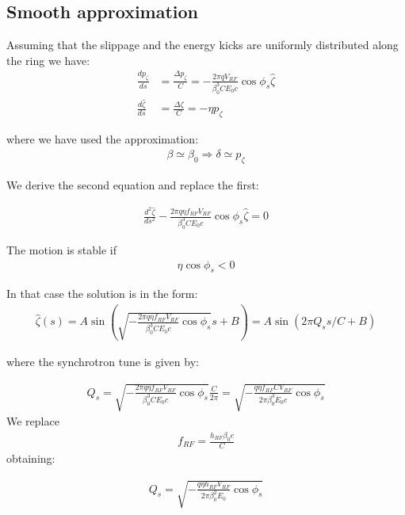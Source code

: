 \subsection{Smooth approximation}

Assuming that the slippage and the energy kicks are uniformly distributed along the ring we have:
\begin{align}
\frac{dp_\zeta}{d s} &= \frac{\Delta {p}_\zeta}{C}
=-\frac{2\pi q V_{RF}}{\beta_0^3 C E_0 c}\cos{\phi_s}\hat{\zeta}
\\
\frac{d\hat{\zeta}}{d s} &= \frac{\Delta \zeta}{C} = -\eta p_\zeta
\label{eg:dzeta_ds}
\end{align}

where we have used the approximation:
\begin{align}
\beta \simeq \beta_0  \Rightarrow \delta \simeq p_\zeta
\end{align}

We derive the second equation and replace the first:

\begin{align}
\frac{d^2\hat{\zeta}}{d s^2}  -  \frac{2\pi q \eta f_{RF} V_{RF}}{\beta_0^3 C E_0 c}\cos{\phi_s}\hat{\zeta} = 0
\end{align}

The motion is stable if
\begin{align}
\eta \cos{\phi_s} < 0
\end{align}

In that case the solution is in the form:
\begin{align}
\hat{\zeta}(s) = A \sin\left( \sqrt{-  \frac{2\pi q \eta f_{RF} V_{RF}}{\beta_0^3 C E_0 c}\cos{\phi_s}} s + B\right) = A \sin\left( 2 \pi Q_s s/C + B\right)
\end{align}

where the synchrotron tune is given by:


\begin{align}
Q_s = \sqrt{-  \frac{2\pi q \eta f_{RF} V_{RF}}{\beta_0^3 C E_0 c}\cos{\phi_s}} \frac{C}{2\pi}
= \sqrt{-  \frac{ q \eta f_{RF} C V_{RF}}{2\pi\beta_0^3 E_0 c}\cos{\phi_s}}
\end{align}
We replace
\begin{align}
f_{RF} = 
\frac{h_{RF} {\beta_0 c}}{C}
\end{align}
obtaining:

\begin{align}
Q_s 
= \sqrt{-  \frac{ q \eta h_{RF} V_{RF}}{2\pi\beta_0^2 E_0}\cos{\phi_s}}
\end{align}

